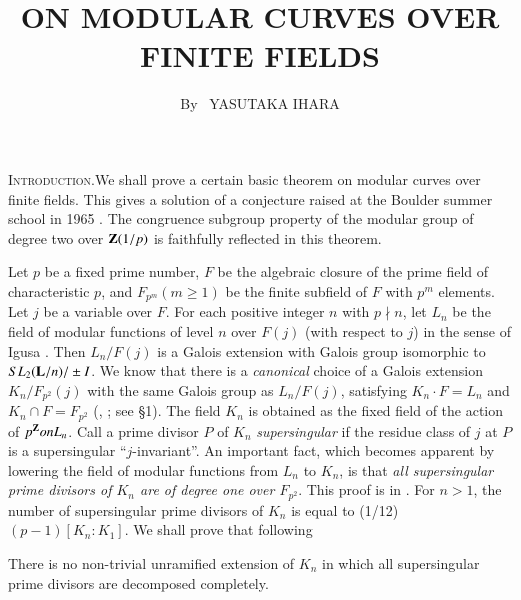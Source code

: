 
\title{ON MODULAR CURVES OVER FINITE FIELDS}

\author{By~ YASUTAKA IHARA}

\date{}
\maketitle


\setcounter{pageoriginal}{160}

\noindent
\textsc{Introduction.}\pageoriginale We shall prove a certain basic theorem on modular curves over finite fields. This gives a solution of a conjecture raised at the Boulder summer school in 1965 \cite{art6-key7}. The congruence subgroup property of the modular group of degree two over $\mathbf{Z}(1/p)$ is faithfully reflected in this theorem.

Let $p$ be a fixed prime number, $F$ be the algebraic closure of the prime field of characteristic $p$, and $F_{p^m} (m \geqslant 1)$ be the finite subfield of $F$ with $p^m$ elements. Let $j$ be a variable over $F$. For each positive integer $n$ with $p\nmid n$, let $L_n$ be the field of modular functions of level $n$ over $F(j)$ (with respect to $j$) in the sense of Igusa \cite{art6-key5}. Then $L_n / F (j)$ is a Galois extension with Galois group isomorphic to $SL_2 (\mathbf{L}/ n) / \pm I$. We know that there is a \textit{canonical} choice of a Galois extension $K_n / F_{p^2} (j)$ with the same Galois group as $L_n / F(j)$, satisfying $K_n \cdot F= L_n$ and $K_n \cap F = F_{p^2}$ (\cite{art6-key7}, \cite{art6-key8}; see \S 1). The field $K_n$ is obtained as the fixed field of the action of $p^{\mathbf{Z}} on L_n$. Call a prime divisor $P$ of $K_n$ \textit{supersingular} if the residue class of $j$ at $P$ is a supersingular ``$j$-invariant''. An important fact, which becomes apparent by lowering the field of modular functions from $L_n$ to $K_n$, is that \textit{all supersingular prime divisors of $K_n$ are of degree one over $F_{p^2}$}. This proof is in \cite{art6-key8}. For $n > 1$, the number of supersingular prime divisors of $K_n$ is equal to (1/12) $(p-1) [K_n: K_1]$. We shall prove that following 

\begin{theorem*}
There is no non-trivial unramified extension of $K_n$ in which all supersingular prime divisors are decomposed completely.
\end{theorem*}


